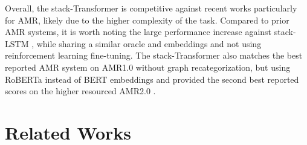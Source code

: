 \documentclass[11pt,a4paper]{article}
\begin{document}
Overall, the stack-Transformer is competitive against recent works particularly for AMR, likely due to the higher complexity of the task. Compared to prior AMR systems, it is worth noting the large performance increase against stack-LSTM \cite{naseem2019rewarding}, while sharing a similar oracle and embeddings and not using reinforcement learning fine-tuning. The stack-Transformer also matches the best reported AMR system \cite{cai2020amr} on AMR1.0 without graph recategorization, but using RoBERTa instead of BERT embeddings and provided the second best reported scores on the higher resourced AMR2.0 \footnotemark{}. 

\begin{table}[!t]
\centering
{}
\caption{Test-set performance for Table~\ref{table:dev} selections and prior art on the AMR1.0 and AMR2.0 in terms of Smatch.}
\label{table:amr-test}
\end{table}



\section{Related Works}
\label{section:related}
\end{document}
